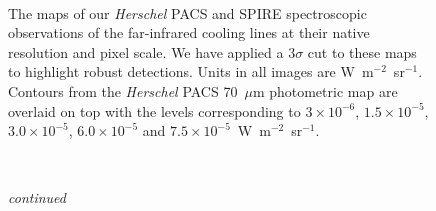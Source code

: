 \begin{figure}[!htbp]
\\
\caption[\emph{Herschel} spectroscopic observations of Centaurus~A at their native resolution]{The maps of our \emph{Herschel} PACS and SPIRE spectroscopic observations of the far-infrared cooling lines at their native resolution and pixel scale.  We have applied a 3$\sigma$ cut to these maps to highlight robust detections.  Units in all images are W~m$^{-2}$~sr$^{-1}$.  Contours from the \emph{Herschel} PACS 70~$\mu$m photometric map are overlaid on top with the levels corresponding to $3 \times 10^{-6}$,  $1.5 \times 10^{-5}$, $3.0 \times 10^{-5}$, $6.0 \times 10^{-5}$ and $7.5 \times 10^{-5}$~W~m$^{-2}$~sr$^{-1}$.}
\label{fig:pacs_spec_maps4}
\end{figure}
\begin{figure}[!htbp]
\ContinuedFloat
{}\\
\caption[]{\emph{continued}}
\end{figure}
